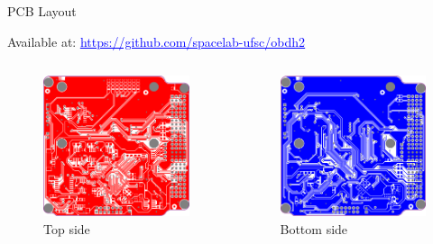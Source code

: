 \begin{frame}{PCB Layout}

    Available at: \href{https://github.com/spacelab-ufsc/obdh2/tree/master/hardware/sources}{\textcolor{blue}{\underline{https://github.com/spacelab-ufsc/obdh2}}}

    \begin{columns}[t]
        \begin{column}[t]{0.5\textwidth}
            \begin{figure}[!ht]
                \begin{center}
                    \includegraphics[width=5cm]{figures/obdh2-layout-top.png}
                \end{center}
                \caption{Top side}
            \end{figure}
        \end{column}
        \begin{column}[t]{0.5\textwidth}
            \begin{figure}[!ht]
                \begin{center}
                    \includegraphics[width=5cm]{figures/obdh2-layout-bottom.png}
                \end{center}
                \caption{Bottom side}
            \end{figure}
        \end{column}
    \end{columns}

\end{frame}

